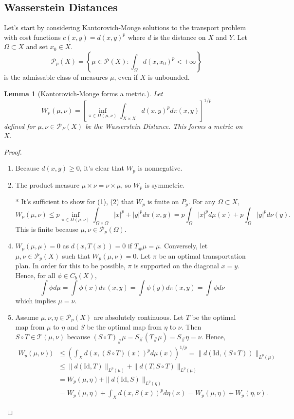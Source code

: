 \documentclass[12pt]{article}
\theoremstyle{plain}
\newtheorem{lem}{Lemma}[section]
\numberwithin{equation}{section}
\begin{document}
\subsection{Wasserstein Distances}
Let's start by considering Kantorovich-Monge solutions to the transport problem with cost functions $c(x,y) = d(x,y)^p$ where $d$ is the distance on $X$ and $Y$.
Let $\Omega\subset X$ and set $x_0\in X$.
\[\mathcal{P}_p(X) = \left\{\mu\in\mathcal{P}(X):\int_{\Omega}d(x,x_0)^p < +\infty\right\}\]
is the admissable class of measures $\mu$, even if $X$ is unbounded.
\begin{lem}[Kantorovich-Monge forms a metric.]\label{lem:wass}
	Let \[W_p(\mu,\nu) = \left[\inf_{\pi\in\Pi(\mu,\nu)}\int_{X\times X}d(x,y)^pd\pi(x,y)\right]^{1/p}\] defined for $\mu,\nu\in\mathcal{P}_P(X)$ be the Wasserstein Distance. This forms a metric on $X$.
\end{lem}
\begin{proof}
  \begin{enumerate}
    \item Because $d(x,y) \ge 0$, it's clear that $W_p$ is nonnegative. 
    \item The product measure $\mu\times \nu = \nu\times \mu$, so $W_p$ is symmetric.
    \item[*] It's sufficient to show for (1), (2) that $W_p$ is finite on $P_p$. For any $\Omega\subset X$,
    \begin{equation}W_p(\mu,\nu) \le p \inf_{\pi\in\Pi(\mu,\nu)}\int_{\Omega\times \Omega} |x|^p + |y|^pd\pi(x,y) = p\int_\Omega|x|^pd\mu(x) + p\int_{\Omega}|y|^pd\nu(y).\end{equation}
    This is finite because $\mu,\nu\in \mathcal{P}_p(\Omega)$.
    \item  $W_p(\mu,\mu) = 0$ as $d(x,T(x)) = 0$ if $T_\# \mu = \mu$. Conversely, let $\mu,\nu\in \mathcal{P}_p(X)$ such that $W_p(\mu,\nu) = 0$. Let $\pi$ be an optimal transportation plan. 
    In order for this to be possible, $\pi$ is supported on the diagonal $x=y$. Hence, for all $\phi\in C_b(X)$,
    \[ \int \phi d\mu = \int \phi(x)d\pi(x,y) = \int\phi(y)d\pi(x,y) = \int\phi d\nu\]
    which implies $\mu=\nu$.
    \item   Assume $\mu,\nu,\eta\in \mathcal{P}_p(X)$ are absolutely continuous. Let $T$ be the optimal map from $\mu$ to $\eta$ and $S$ be the optimal map from $\eta$ to $\nu$.
    Then $S\circ T\in \mathcal{T}(\mu,\nu)$ because $(S\circ T)_\#\mu = S_\#(T_\#\mu) = S_\#\eta = \nu$. Hence,
    \begin{align*}
      W_p(\mu,\nu)) &\le \left(\int_Xd(x,(S\circ T)(x))^pd\mu(x)\right)^{1/p} = \|d(\text{Id},(S\circ T))\|_{L^p(\mu)} \\
      &\le \|d(\text{Id},T)\|_{L^p(\mu)} + \|d(T, S\circ T)\|_{L^p(\mu)} \\
      &= W_p(\mu,\eta) + \|d(\text{Id}, S)\|_{L^p(\eta)} \\
      &= W_p(\mu,\eta) + \int_{X}d(x,S(x))^pd\eta(x) = W_p(\mu,\eta) + W_p(\eta,\nu).
      \end{align*}
  \end{enumerate}
\end{proof}
\end{document}
